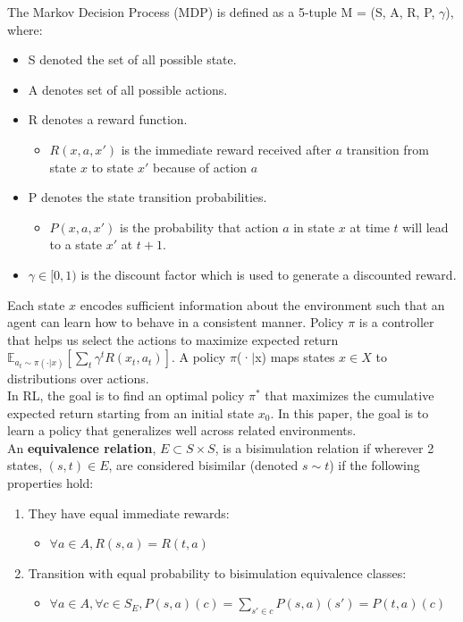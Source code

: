 \documentclass{usiinftr}
\begin{document}
The Markov Decision Process (MDP) is defined as a 5-tuple M = (S, A, R, P, $\gamma$), where:
\begin{itemize}
    \item S denoted the set of all possible state.
    \item A denotes set of all possible actions.
    \item R denotes a reward function.
    \begin{itemize}
        \item $R(x,a,x')$ is the immediate reward received after $a$ transition from state $x$ to state $x'$ because of action $a$
    \end{itemize}
    \item P denotes the state transition probabilities.
    \begin{itemize}
        \item $P(x,a,x')$ is the probability that action $a$ in state $x$ at time $t$ will lead to a state $x'$ at $t+1$.
    \end{itemize}
    \item $\gamma \in  [0, 1)$  is the discount factor which is used to generate a discounted reward.
\end{itemize}

Each state $x$ encodes sufficient information about the environment such that an agent can learn how to behave in a consistent manner. Policy $\pi$ is a controller that helps us select the actions to maximize expected return $\mathbb{E}_{a_{t}\sim \pi(\cdot|x)} [\sum_t \gamma^t R(x_t,a_t)]$. A policy $\pi$(·$|$x) maps states $x \in X$ to distributions over actions. \\

In RL, the goal is to find an optimal policy $\pi^*$ that maximizes the cumulative expected return starting from an initial state $x_0$. In this paper, the goal is to learn a policy that generalizes well across related environments. \\

An \textbf{equivalence relation}, $E \subset S \times S$, is a bisimulation relation if wherever 2 states, $(s,t) \in E$, are considered bisimilar (denoted $s \sim t$) if the following properties hold:

\begin{enumerate}
    \item They have equal immediate rewards: 
    \begin{itemize}
        \item $\forall a \in A, R(s,a) = R(t,a)$
    \end{itemize}
    \item Transition with equal probability to bisimulation equivalence classes:
    \begin{itemize}
        \item $\forall a \in A, \forall c \in S_E, P(s,a)(c) = \sum_{s'\in c} P(s,a)(s') = P(t,a)(c)$
    \end{itemize}
\end{enumerate}
\end{document}
